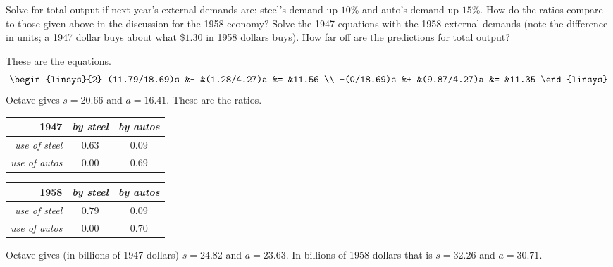 \begin{exercises}
\begin{center}
    \end{center}
    \begin{exparts}
      \partsitem Solve for total output if next year's external
         demands are: steel's demand up $10$\% and auto's demand up
         $15$\%.
      \partsitem How do the ratios compare to those given above in the
         discussion for the 1958 economy?
      \partsitem Solve the 1947 equations with the 1958 external demands
         (note the difference in units; a 1947 dollar buys about
         what \$$1.30$ in 1958 dollars buys).
         How far off are the predictions for total output?
    \end{exparts}
    \begin{answer}
      \begin{exparts}
        \partsitem 
          These are the equations.
	  \begin{equation*}
	    \begin{linsys}{2}
	       (11.79/18.69)s   &-   &(1.28/4.27)a &= &11.56 \\ 
	       -(0/18.69)s   &+   &(9.87/4.27)a &= &11.35 
	    \end{linsys}
	  \end{equation*}
          Octave gives $s=20.66$ and $a=16.41$.
	\partsitem
          These are the ratios.
	  \begin{center}
            \begin{tabular}{r|cc}
               1947   &\textit{by steel}  &\textit{by autos}  \\ \hline
               \textit{use of steel}  &$0.63$ &$0.09$  \\
               \textit{use of autos}  &$0.00$ &$0.69$  
            \end{tabular}
            \qquad
            \begin{tabular}{r|cc}
               1958   &\textit{by steel}  &\textit{by autos}  \\ \hline
               \textit{use of steel}  &$0.79$ &$0.09$  \\
               \textit{use of autos}  &$0.00$ &$0.70$  
            \end{tabular}
          \end{center}
	\partsitem
          Octave gives (in billions of 1947 dollars) $s=24.82$ and $a=23.63$.
          In billions of 1958 dollars that is $s=32.26$ and $a=30.71$.
      \end{exparts}
    \end{answer}
  \item 

\end{exercises}
